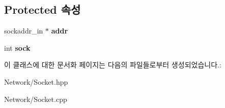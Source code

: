 \subsection*{Protected 속성}
\begin{DoxyCompactItemize}
\item 
\mbox{\label{class_socket_a5b61d95da48d2d06f428ba4ef1ce67bb}} 
sockaddr\+\_\+in $\ast$ {\bfseries addr}
\item 
\mbox{\label{class_socket_a231ddf6e338a86640e26808b83efeaa1}} 
int {\bfseries sock}
\end{DoxyCompactItemize}


이 클래스에 대한 문서화 페이지는 다음의 파일들로부터 생성되었습니다.\+:\begin{DoxyCompactItemize}
\item 
Network/Socket.\+hpp\item 
Network/Socket.\+cpp\end{DoxyCompactItemize}
